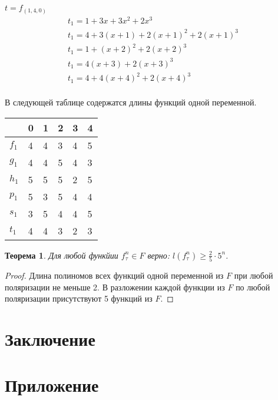 \documentclass[bibliography=totoc, a4paper, 14pt]{extarticle}
\let\stdsection\section
\renewcommand\section{\newpage\stdsection}
\newtheorem{myth}{Теорема}
\begin{document}
$t=f_{(1,4,0)}$
$$
\begin{array}{l}
t_1 = 1 + 3x + 3x^2 + 2x^3 \\
t_1 = 4 + 3(x+1) + 2(x+1)^2 + 2(x+1)^3 \\
t_1 = 1 + (x+2)^2 + 2(x+2)^3 \\
t_1 = 4(x+3) + 2(x+3)^3 \\
t_1 = 4 + 4(x+4)^2 + 2(x+4)^3 \\
\end{array}
$$

В следующей таблице содержатся длины функций одной переменной.

\begin{center}
\begin{tabular}{| l | l | l | l | l | l |}
\hline
 & 0 & 1 & 2 & 3 & 4 \\
\hline
$f_{1}$ & 4 & 4 & 3 & 4 & 5 \\
\hline
$g_{1}$ & 4 & 4 & 5 & 4 & 3 \\
\hline
$h_{1}$ & 5 & 5 & 5 & 2 & 5 \\
\hline
$p_{1}$ & 5 & 3 & 5 & 4 & 4 \\
\hline
$s_{1}$ & 3 & 5 & 4 & 4 & 5 \\
\hline
$t_{1}$ & 4 & 4 & 3 & 2 & 3 \\
\hline
\end{tabular}
\end{center}

\begin{myth} Для любой функйии $f^n_{\tau} \in F$ верно:
$l(f^n_{\tau}) \geqslant \frac{2}{5}\cdot 5^n$.
\end{myth}
\begin{proof}
Длина полиномов всех функций одной переменной из $F$ при любой поляризации не меньше 2.
В разложении каждой функции из $F$ по любой поляризации присутствуют 5 функций из $F$.
\end{proof}

\section{Заключение}

\section{Приложение}

%
\end{document}
